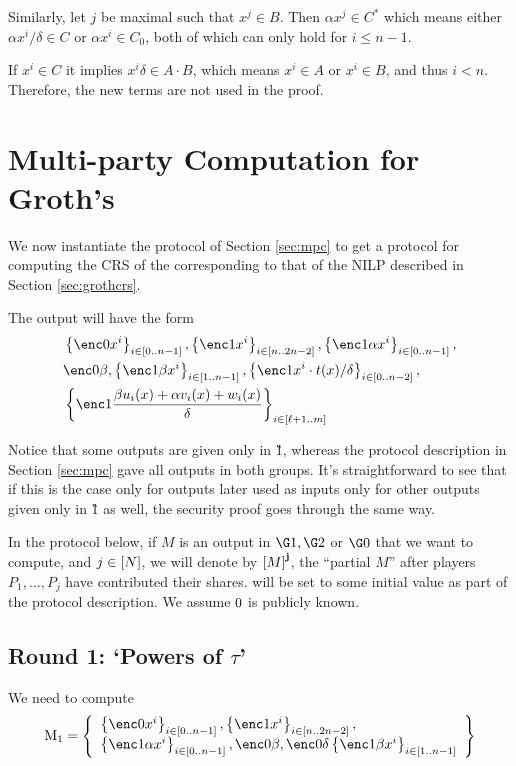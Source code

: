 \documentclass{article}
\begin{document}
Similarly, let $j$ be maximal such that $x^j \in B$.
Then $\alpha  x^j \in C^*$
which means either $\alpha x^i/\delta \in C$ or $\alpha x^i \in C_0$,
both of which can only hold for $i\leq n-1$.

If $x^i\in C$ it implies $x^i\delta\in A\cdot B$, which means $x^i\in A$ or $x^i\in B$,
and thus $i<n$.
Therefore, the new terms  are not used in the proof.


\section{Multi-party Computation for Groth's  {\snark}}

We now instantiate the protocol of Section \ref{sec:mpc} to get a protocol for computing the CRS of the
{\snark} corresponding to that of the NILP described in Section \ref{sec:grothcrs}.

The output will have the form
\begin{align*}
&\sett{\enc0{x^i}}{i\in[0..n-1]},\sett{\enc1{x^i}}{i\in[n..2n-2]},\sett{\enc1{\alpha x^i}}{i\in[0..n-1]},\\
&\enc0{\beta},\sett{\enc1{\beta x^i}}{i\in[1..n-1]}, \sett{\enc1{x^i\cdot t(x)/\delta}}{i\in[0..n-2]},\\
&\sett{\enc1{\frac{\beta u_i(x)+ \alpha v_i(x) + w_i(x)}{\delta}}}{i\in [\ell+1..m]} 
\end{align*}


Notice that some outputs are given only in \G1, whereas the protocol description in Section \ref{sec:mpc} gave
all outputs in both groups. It's straightforward to see that if this is the case only for outputs later used as inputs only for other outputs
given only in \G1 as well, the security proof goes through the same way.



In the protocol below, if $M$ is an output in $\G1,\G2$ or $\G0$ that we want to compute, and $j\in [N]$,
we will denote by ${{[M]}^{\mathbf{j}}}$, the ``partial $M$'' after players $P_1,\ldots,P_j$ have contributed their shares.
 will be set to some initial value as part of the protocol description.
We assume $\g0$ is publicly known.


\subsection{Round 1: `Powers of $\tau$'}
We need to compute  
\[
\muloflayer{1}=\left\{
\begin{array}{ll}
  \sett{\enc0{x^i}}{i\in[0..n-1]},\sett{\enc1{x^i}}{i\in[n..2n-2]},\\\sett{\enc1{\alpha x^i}}{i\in[0..n-1]},\enc0{\beta},\enc0{\delta}
 \sett{\enc1{\beta x^i}}{i\in[1..n-1]}
\end{array}
\right\}
\]
\end{document}
